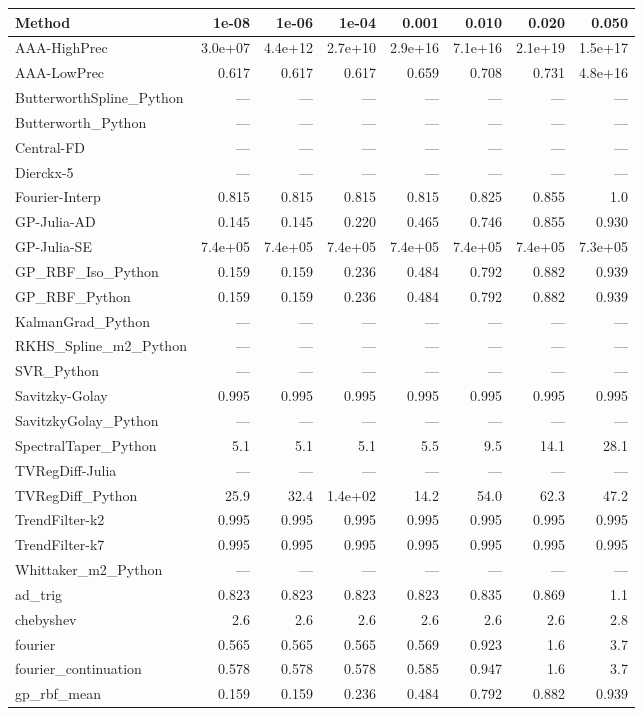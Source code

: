 \documentclass[10pt]{article}
\begin{document}
\begin{longtable}{lrrrrrrr}
\toprule
\textbf{Method} & \textbf{1e-08} & \textbf{1e-06} & \textbf{1e-04} & \textbf{0.001} & \textbf{0.010} & \textbf{0.020} & \textbf{0.050} \\
\midrule
\endhead
AAA-HighPrec & 3.0e+07 & 4.4e+12 & 2.7e+10 & 2.9e+16 & 7.1e+16 & 2.1e+19 & 1.5e+17 \\
AAA-LowPrec & 0.617 & 0.617 & 0.617 & 0.659 & 0.708 & 0.731 & 4.8e+16 \\
ButterworthSpline\_Python & --- & --- & --- & --- & --- & --- & --- \\
Butterworth\_Python & --- & --- & --- & --- & --- & --- & --- \\
Central-FD & --- & --- & --- & --- & --- & --- & --- \\
Dierckx-5 & --- & --- & --- & --- & --- & --- & --- \\
Fourier-Interp & 0.815 & 0.815 & 0.815 & 0.815 & 0.825 & 0.855 & 1.0 \\
GP-Julia-AD & 0.145 & 0.145 & 0.220 & 0.465 & 0.746 & 0.855 & 0.930 \\
GP-Julia-SE & 7.4e+05 & 7.4e+05 & 7.4e+05 & 7.4e+05 & 7.4e+05 & 7.4e+05 & 7.3e+05 \\
GP\_RBF\_Iso\_Python & 0.159 & 0.159 & 0.236 & 0.484 & 0.792 & 0.882 & 0.939 \\
GP\_RBF\_Python & 0.159 & 0.159 & 0.236 & 0.484 & 0.792 & 0.882 & 0.939 \\
KalmanGrad\_Python & --- & --- & --- & --- & --- & --- & --- \\
RKHS\_Spline\_m2\_Python & --- & --- & --- & --- & --- & --- & --- \\
SVR\_Python & --- & --- & --- & --- & --- & --- & --- \\
Savitzky-Golay & 0.995 & 0.995 & 0.995 & 0.995 & 0.995 & 0.995 & 0.995 \\
SavitzkyGolay\_Python & --- & --- & --- & --- & --- & --- & --- \\
SpectralTaper\_Python & 5.1 & 5.1 & 5.1 & 5.5 & 9.5 & 14.1 & 28.1 \\
TVRegDiff-Julia & --- & --- & --- & --- & --- & --- & --- \\
TVRegDiff\_Python & 25.9 & 32.4 & 1.4e+02 & 14.2 & 54.0 & 62.3 & 47.2 \\
TrendFilter-k2 & 0.995 & 0.995 & 0.995 & 0.995 & 0.995 & 0.995 & 0.995 \\
TrendFilter-k7 & 0.995 & 0.995 & 0.995 & 0.995 & 0.995 & 0.995 & 0.995 \\
Whittaker\_m2\_Python & --- & --- & --- & --- & --- & --- & --- \\
ad\_trig & 0.823 & 0.823 & 0.823 & 0.823 & 0.835 & 0.869 & 1.1 \\
chebyshev & 2.6 & 2.6 & 2.6 & 2.6 & 2.6 & 2.6 & 2.8 \\
fourier & 0.565 & 0.565 & 0.565 & 0.569 & 0.923 & 1.6 & 3.7 \\
fourier\_continuation & 0.578 & 0.578 & 0.578 & 0.585 & 0.947 & 1.6 & 3.7 \\
gp\_rbf\_mean & 0.159 & 0.159 & 0.236 & 0.484 & 0.792 & 0.882 & 0.939 \\
\bottomrule
\end{longtable}
\end{document}
